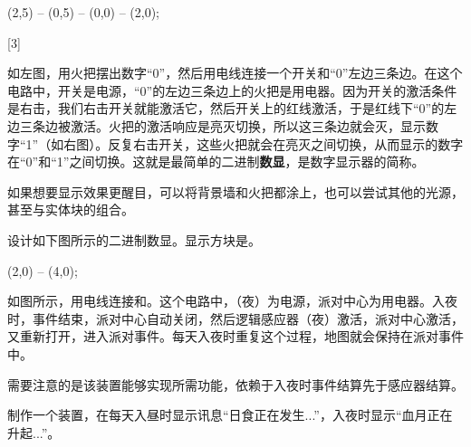 \begin{example}{}{}
  \begin{center}
    \begin{tikzpictureC}[TRsch]
       (2,5) -- (0,5) -- (0,0) -- (2,0);
    \end{tikzpictureC}%
    [3]%
    \begin{tikzpictureC}[TRsch]
    \end{tikzpictureC}
  \end{center}
  如左图，用火把摆出数字“0”，然后用电线连接一个开关和“0”左边三条边。在这个电路中，开关是电源，“0”的左边三条边上的火把是用电器。因为开关的激活条件是右击，我们右击开关就能激活它，然后开关上的红线激活，于是红线下“0”的左边三条边被激活。火把的激活响应是亮灭切换，所以这三条边就会灭，显示数字“1”（如右图）。反复右击开关，这些火把就会在亮灭之间切换，从而显示的数字在“0”和“1”之间切换。这就是最简单的二进制\textbf{数显}，是数字显示器的简称。

  \begin{remark*}{}{}
    如果想要显示效果更醒目，可以将背景墙和火把都涂上，也可以尝试其他的光源，甚至与实体块的组合。
  \end{remark*}

  \begin{problem}{}{}
    设计如下图所示的二进制数显。显示方块是。
    \begin{center}
    \end{center}
  \end{problem}
\end{example}

\begin{example}{}{}
  \begin{center}
    \begin{tikzpictureC}[TRsch]
       (2,0) -- (4,0);
    \end{tikzpictureC}
  \end{center}
  如图所示，用电线连接和。这个电路中，（夜）为电源，派对中心为用电器。入夜时，事件结束，派对中心自动关闭，然后逻辑感应器（夜）激活，派对中心激活，又重新打开，进入派对事件。每天入夜时重复这个过程，地图就会保持在派对事件中。
  \begin{remark*}{}{}
    需要注意的是该装置能够实现所需功能，依赖于入夜时事件结算先于感应器结算。
  \end{remark*}
  \begin{problem}{}{}
    制作一个装置，在每天入昼时显示讯息“日食正在发生...”，入夜时显示“血月正在升起...”。
  \end{problem}
\end{example}

